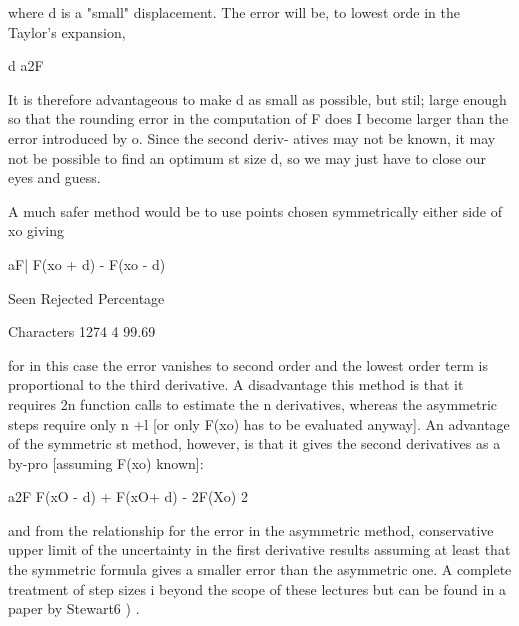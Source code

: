  
 
 
 
 
 
 
 
 
 
 
 
 
 
 
 
 
 
 
 
 
 
 
 
 
 
 
where d is a "small" displacement.  The error will be, to lowest orde
in the Taylor's expansion,
 
 
                                d   a2F
 
 
 
It is therefore advantageous to make d as small as possible, but stil;
large enough so that the rounding error in the computation of F does I
become larger than the error introduced by o.  Since the second deriv-
atives may not be known, it may not be possible to find an optimum st
size d, so we may just have to close our eyes and guess.
 
     A much safer method would be to use points chosen symmetrically
either side of xo giving
 
 
                      aF|     F(xo + d) - F(xo - d)
 
                 Seen Rejected  Percentage
 
Characters       1274        4   99.69
 
 
 
for in this case the error  vanishes to second order and the lowest
order term is proportional to the third derivative.  A disadvantage
this method is that it requires 2n function calls to estimate the n
derivatives, whereas the asymmetric steps require only n +l [or only
F(xo) has to be evaluated anyway].  An advantage of the symmetric st
method, however, is that it gives the second derivatives as a by-pro
[assuming F(xo) known]:
 
                 a2F   F(xO - d) + F(xO+ d) - 2F(Xo)
                                      2
 
 
and from the relationship for the error  in the asymmetric method,
conservative upper limit of the uncertainty in the first derivative
results assuming at least that the symmetric formula gives a smaller
error than the asymmetric one.  A complete treatment of step sizes i
beyond the scope of these lectures but can be found in a paper by
Stewart6 ) .
 
